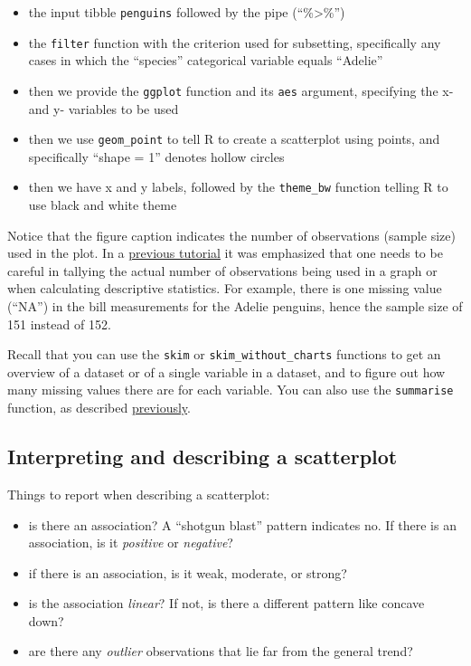 \documentclass[
]{book}
\providecommand{\tightlist}{%
  \setlength{\itemsep}{0pt}\setlength{\parskip}{0pt}}
\begin{document}
\begin{itemize}
\tightlist
\item
  the input tibble \texttt{penguins} followed by the pipe (``\%\textgreater\%'')
\item
  the \texttt{filter} function with the criterion used for subsetting, specifically any cases in which the ``species'' categorical variable equals ``Adelie''
\item
  then we provide the \texttt{ggplot} function and its \texttt{aes} argument, specifying the x- and y- variables to be used
\item
  then we use \texttt{geom\_point} to tell R to create a scatterplot using points, and specifically ``shape = 1'' denotes hollow circles
\item
  then we have x and y labels, followed by the \texttt{theme\_bw} function telling R to use black and white theme
\end{itemize}

Notice that the figure caption indicates the number of observations (sample size) used in the plot. In a \hyperref[vis_describe]{previous tutorial} it was emphasized that one needs to be careful in tallying the actual number of observations being used in a graph or when calculating descriptive statistics. For example, there is one missing value (``NA'') in the bill measurements for the Adelie penguins, hence the sample size of 151 instead of 152.

Recall that you can use the \texttt{skim} or \texttt{skim\_without\_charts} functions to get an overview of a dataset or of a single variable in a dataset, and to figure out how many missing values there are for each variable. You can also use the \texttt{summarise} function, as described \hyperref[mean_sd]{previously}.

\subsection{Interpreting and describing a scatterplot}\label{interpret_scatter}

Things to report when describing a scatterplot:

\begin{itemize}
\tightlist
\item
  is there an association? A ``shotgun blast'' pattern indicates no. If there is an association, is it \emph{positive} or \emph{negative}?
\item
  if there is an association, is it weak, moderate, or strong?
\item
  is the association \emph{linear}? If not, is there a different pattern like concave down?
\item
  are there any \emph{outlier} observations that lie far from the general trend?
\end{itemize}
\end{document}
